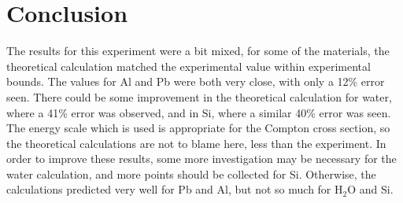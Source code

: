 \documentclass[letterpaper,12pt]{article}
\begin{document}
\section{Conclusion}
The results for this experiment were a bit mixed, for some of the materials, the theoretical calculation matched the experimental value within experimental bounds. The values for Al and Pb were both very close, with only a 12\% error seen. There could be some improvement in the theoretical calculation for water, where a 41\% error was observed, and in Si, where a similar 40\% error was seen. The energy scale which is used is appropriate for the Compton cross section, so the theoretical calculations are not to blame here, less than the experiment. In order to improve these results, some more investigation may be necessary for the water calculation, and more points should be collected for Si. Otherwise, the calculations predicted very well for Pb and Al, but not so much for H$_2$O and Si.



\end{document}
